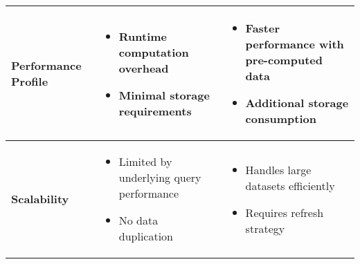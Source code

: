 \begin{table}[H]
{\begin{tabular}{
      >{\raggedright\arraybackslash}m{} 
      >{\raggedright\arraybackslash}m{} 
      >{\raggedright\arraybackslash}m{}
    }
      \hline
      
      \cellcolor{blue!5}\textbf{Performance Profile} & 
      \begin{itemize}[leftmargin=*,noitemsep,topsep=2pt]
        \item[\color{red}\textbullet] Runtime computation overhead
        \item[\color{green!60!black}\textbullet] Minimal storage requirements
      \end{itemize} & 
      \begin{itemize}[leftmargin=*,noitemsep,topsep=2pt]
        \item[\color{green!60!black}\textbullet] Faster performance with pre-computed data 
        \item[\color{red}\textbullet] Additional storage consumption
      \end{itemize} \\
      
      \hline
      
      \cellcolor{blue!5}\textbf{Scalability} & 
      \begin{itemize}[leftmargin=*,noitemsep,topsep=2pt]
        \item[\color{red}\textbullet] Limited by underlying query performance
        \item[\color{green!60!black}\textbullet] No data duplication
      \end{itemize} & 
      \begin{itemize}[leftmargin=*,noitemsep,topsep=2pt]
        \item[\color{green!60!black}\textbullet] Handles large datasets efficiently
        \item[\color{red}\textbullet] Requires refresh strategy
      \end{itemize} \\
      
      \hline
      

\end{tabular}}
\end{table}
